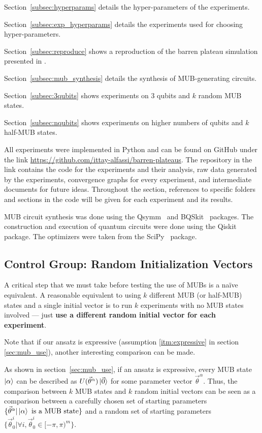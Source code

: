 \documentclass[a4paper,12pt]{article}
\newcommand{\thetas}{\vec{\theta}}
\begin{document}
Section~\ref{subsec:hyperparams} details the hyper-parameters of the experiments.

Section~\ref{subsec:exp_hyperparams} details the experiments used for choosing hyper-parameters.

Section~\ref{subsec:reproduce} shows a reproduction of the barren plateau simulation presented in \cite{arrasmith_effect_2021}.

Section~\ref{subsec:mub_synthesis} details the synthesis of MUB-generating circuits.

Section~\ref{subsec:3qubits} shows experiments on 3 qubits and $k$ random MUB states.

Section~\ref{subsec:nqubits} shows experiments on higher numbers of qubits and $k$ half-MUB states.

All experiments were implemented in Python and can be found on GitHub under the link \url{https://github.com/ittay-alfassi/barren-plateaus}.
The repository in the link contains the code for the experiments and their analysis, raw data generated by the experiments, convergence graphs for every experiment, and intermediate documents for future ideas.
Throughout the section, references to specific folders and sections in the code will be given for each experiment and its results.

MUB circuit synthesis was done using the Qsymm~\cite{qsymm} and BQSkit~\cite{bqskit} packages.
The construction and execution of quantum circuits were done using the Qiskit~\cite{qiskit} package.
The optimizers were taken from the SciPy~\cite{scipy} package.

\subsection{Control Group: Random Initialization Vectors} \label{meth:random_thetas}
A critical step that we must take before testing the use of MUBs is a na{\"i}ve equivalent.
A reasonable equivalent to using $k$ different MUB (or half-MUB) states and a single initial vector is to run $k$ experiments with no MUB states involved --- just \textbf{use a different random initial vector for each experiment}.

Note that if our ansatz is expressive (assumption \ref{itm:expressive} in section \ref{sec:mub_use}), another interesting comparison can be made.

As shown in section~\ref{sec:mub_use}, if an ansatz is expressive, every MUB state $\ket{\alpha}$ can be described as $U(\thetas^\alpha)\ket{\vec{0}}$ for some parameter vector $\thetas^\alpha$.
Thus, the comparison between $k$ MUB states and $k$ random initial vectors can be seen as a comparison between a carefully chosen set of starting parameters $\{\thetas^{\alpha} | \ket{\alpha} \textrm{ is a MUB state}\}$ and a random set of starting parameters $\{\thetas_0^i | \forall i, \thetas_{0}^{i} \in [-\pi, \pi)^m\}$.
\end{document}

